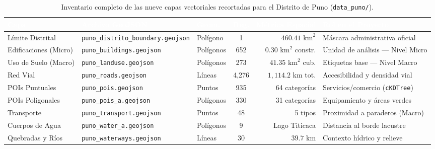 \documentclass[11pt,a4paper]{article}
\begin{document}
\begin{table}[H]
    \centering
    \caption{Inventario completo de las nueve capas vectoriales recortadas para el Distrito de Puno (\texttt{data\_puno/}).}
    \label{tab:inventario_puno}
    \setlength{\tabcolsep}{4pt}
    \footnotesize
    \begin{adjustbox}{max width=\textwidth}
    \begin{tabular}{lllcrl}
        \toprule
        \rowcolor{verdeHeader}
        \textcolor{white}{\textbf{Capa}} & \textcolor{white}{\textbf{Archivo GeoJSON}} & \textcolor{white}{\textbf{Geom.}} & \textcolor{white}{\textbf{Reg.}} & \textcolor{white}{\textbf{Métrica Espacial}} & \textcolor{white}{\textbf{Rol en el Proyecto}} \\
        \midrule
        Límite Distrital & \texttt{puno\_distrito\_boundary.geojson} & Polígono & 1 & $460.41\text{ km}^2$ & Máscara administrativa oficial \\
        \rowcolor{verdeSuave!50}
        Edificaciones (Micro) & \texttt{puno\_buildings.geojson} & Polígonos & 652 & $0.30\text{ km}^2$ constr. & Unidad de análisis — Nivel Micro \\
        Uso de Suelo (Macro) & \texttt{puno\_landuse.geojson} & Polígonos & 273 & $41.35\text{ km}^2$ cub. & Etiquetas base — Nivel Macro \\
        \rowcolor{verdeSuave!50}
        Red Vial & \texttt{puno\_roads.geojson} & Líneas & 4{,}276 & $1{,}114.2\text{ km}$ tot. & Accesibilidad y densidad vial \\
        POIs Puntuales & \texttt{puno\_pois.geojson} & Puntos & 935 & 64 categorías & Servicios/comercio (\texttt{cKDTree}) \\
        \rowcolor{verdeSuave!50}
        POIs Poligonales & \texttt{puno\_pois\_a.geojson} & Polígonos & 330 & 31 categorías & Equipamiento y áreas verdes \\
        Transporte & \texttt{puno\_transport.geojson} & Puntos & 48 & 5 tipos & Proximidad a paraderos (Macro) \\
        \rowcolor{verdeSuave!50}
        Cuerpos de Agua & \texttt{puno\_water\_a.geojson} & Polígonos & 9 & Lago Titicaca & Distancia al borde lacustre \\
        Quebradas y Ríos & \texttt{puno\_waterways.geojson} & Líneas & 30 & $39.7\text{ km}$ & Contexto hídrico y relieve \\
        \bottomrule
    \end{tabular}
    \end{adjustbox}
\end{table}
\end{document}
